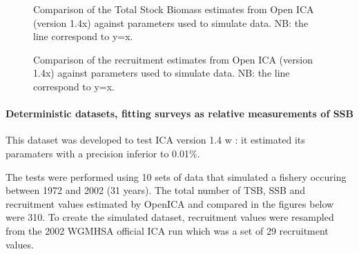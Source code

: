  \begin{figure}
  	\begin{center}
  	\end{center}
  	\caption{Comparison of the Total Stock Biomass estimates from Open ICA (version 1.4x) against parameters used to simulate data. NB: the line correspond to y=x.}
  \end{figure}

  \begin{figure}
  	\begin{center}
  	\end{center}
  	\caption{Comparison of the recruitment estimates from Open ICA (version 1.4x) against parameters used to simulate data. NB: the line correspond to y=x.}
  \end{figure}


\paragraph{Deterministic datasets, fitting surveys as relative measurements of SSB}

This dataset was developed to test ICA version 1.4 w \citep{kieTR05}: it estimated its paramaters with a precision inferior to 0.01\%. 

The tests were performed using 10 sets of data that simulated a fishery occuring between 1972 and 2002 (31 years). The total number of TSB, SSB and recruitment values estimated by OpenICA and compared in the figures below were 310. To create the simulated dataset, recruitment values were resampled from the 2002 WGMHSA official ICA run which was a set of 29 recruitment values.


